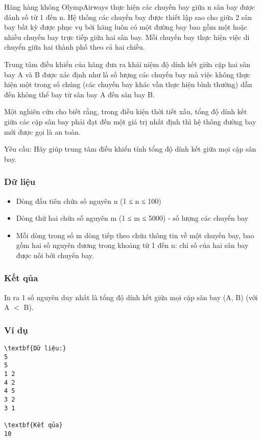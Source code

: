 



   Hãng hàng không OlympAirways thực hiện các chuyến bay giữa n sân bay được đánh số từ 1 đến n. Hệ thống các chuyến bay được thiết lập sao cho giữa 2 sân bay bất kỳ được   phục vụ bởi hãng luôn có một đường bay bao gồm một hoặc nhiều chuyến bay trực tiếp giữa hai sân bay. Mỗi chuyến bay thực hiện việc di chuyển giữa   hai thành phố theo cả hai chiều.  

   Trung tâm điều khiển của hãng đưa ra khái niệm độ dính kết giữa cặp hai sân bay A và B được xác định như là số lượng các chuyến bay mà việc không thực hiện một trong số chúng (các chuyến bay khác   vẫn thực hiện bình thường) dẫn đến không thể bay từ sân bay A đến sân bay B.  

   Một nghiên cứu cho biết rằng, trong điều kiện thời tiết xấu, tổng độ dính kết giữa các cặp sân bay phải đạt đến một giá trị nhất định thì hệ thống đường bay mới được gọi là an toàn.  

   Yêu cầu: Hãy giúp trung tâm điều khiển tính tổng độ dính kết giữa mọi cặp sân bay.  

\subsubsection{   Dữ liệu  }
\begin{itemize}
	\item     Dòng đầu tiên chứa số nguyên n (1 ≤ n ≤ 100)   
	\item     Dòng thứ hai chứa số nguyên m (1 ≤ m ≤ 5000) - số lượng các chuyến bay   
	\item     Mỗi dòng trong số m dòng tiếp theo chứa thông tin về một chuyến bay, bao gồm hai số nguyên dương trong khoảng từ 1 đến n: chỉ số của hai sân bay được nối bởi chuyến bay.   
\end{itemize}

\subsubsection{   Kết qủa  }

   In ra 1 số nguyên duy nhất là tổng độ dính kết giữa mọi cặp sân bay (A, B) (với A $<$ B).  

\subsubsection{   Ví dụ  }
\begin{verbatim}
\textbf{Dữ liệu:}
5
5
1 2
4 2
4 5
3 2
3 1

\textbf{Kết qủa}
10
\end{verbatim}